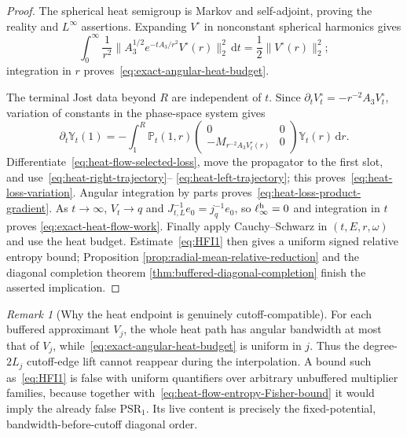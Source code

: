 \documentclass[11pt]{article}
\newcommand{\dd}{\,\mathrm d}
\theoremstyle{definition}
\theoremstyle{remark}
\newtheorem{remark}[theorem]{Remark}
\begin{document}
\begin{proof}
The spherical heat semigroup is Markov and self-adjoint, proving the reality
and $L^\infty$ assertions.  Expanding $V^\circ$ in nonconstant spherical
harmonics gives
\begin{equation}
 \int_0^\infty\frac1{r^2}
  \|A_3^{1/2}e^{-tA_3/r^2}V^\circ(r)\|_2^2\dd t
 =\frac12\|V^\circ(r)\|_2^2;
\end{equation}
integration in $r$ proves~\eqref{eq:exact-angular-heat-budget}.

The terminal Jost data beyond $R$ are independent of $t$.  Since
$\partial_tV_t^\circ=-r^{-2}A_3V_t^\circ$, variation of constants in the phase-space
system gives
\begin{equation}
 \partial_t\mathbb Y_t(1)
 =-\int_1^R\mathbb P_t(1,r)
   \begin{pmatrix}0&0\\-M_{r^{-2}A_3V_t^\circ(r)}&0\end{pmatrix}
   \mathbb Y_t(r)\dd r.
\end{equation}
Differentiate~\eqref{eq:heat-flow-selected-loss}, move the propagator to the
first slot, and use~\eqref{eq:heat-right-trajectory}--
\eqref{eq:heat-left-trajectory}; this proves~\eqref{eq:heat-loss-variation}.
Angular integration by parts proves~\eqref{eq:heat-loss-product-gradient}.
As $t\to\infty$, $V_t\to q$ and
$J_{t,L}^{-1}e_0=j_q^{-1}e_0$, so
$\ell_\infty^{\rm h}=0$ and integration in $t$ proves
\eqref{eq:exact-heat-flow-work}.  Finally apply Cauchy--Schwarz in
$(t,E,r,\omega)$ and use the heat budget.  Estimate~\eqref{eq:HFI1} then gives
a uniform signed relative entropy bound; Proposition
\ref{prop:radial-mean-relative-reduction} and the diagonal completion theorem
\ref{thm:buffered-diagonal-completion} finish the asserted implication.
\end{proof}

\begin{remark}[Why the heat endpoint is genuinely cutoff-compatible]
\label{rem:heat-endpoint-cutoff-compatible}
For each buffered approximant $V_j$, the whole heat path has angular bandwidth
at most that of $V_j$, while~\eqref{eq:exact-angular-heat-budget} is uniform in
$j$.  Thus the degree-$2L_j$ cutoff-edge lift cannot reappear during the
interpolation.  A bound such as~\eqref{eq:HFI1} is false with uniform
quantifiers over arbitrary unbuffered multiplier families, because together
with~\eqref{eq:heat-flow-entropy-Fisher-bound} it would imply the already false
$\mathrm{PSR}_1$.  Its live content is precisely the fixed-potential,
bandwidth-before-cutoff diagonal order.
\end{remark}
\end{document}
